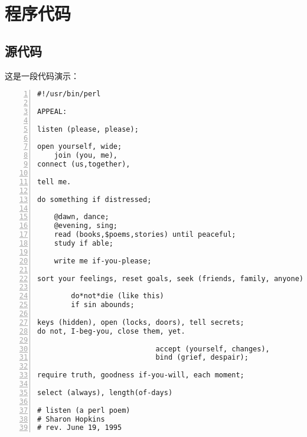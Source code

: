 \mainmatter%
\chapter{程序代码}\label{app:src}
\section{源代码}
这是一段代码演示：
\begin{Verbatim}[frame=single,numbers=left]
#!/usr/bin/perl

APPEAL:

listen (please, please);

open yourself, wide;
    join (you, me),
connect (us,together),

tell me.

do something if distressed;

    @dawn, dance;
    @evening, sing;
    read (books,$poems,stories) until peaceful;
    study if able;

    write me if-you-please;

sort your feelings, reset goals, seek (friends, family, anyone);

        do*not*die (like this)
        if sin abounds;

keys (hidden), open (locks, doors), tell secrets;
do not, I-beg-you, close them, yet.

                            accept (yourself, changes),
                            bind (grief, despair);

require truth, goodness if-you-will, each moment;

select (always), length(of-days)

# listen (a perl poem)
# Sharon Hopkins
# rev. June 19, 1995
\end{Verbatim}
